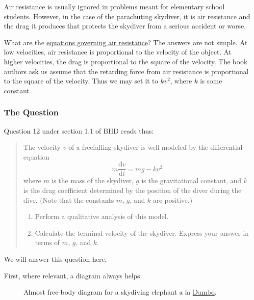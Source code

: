 \documentclass[
  a4paper,
]{article}
\begin{document}
Air resistance is usually ignored in problems meant for elementary
school students. However, in the case of the parachuting skydiver, it is
air resistance and the drag it produces that protects the skydiver from
a serious accident or worse.

What are the
\href{https://en.wikipedia.org/wiki/Drag_(physics)}{equations governing
air resistance}? The answers are not simple. At low velocities, air
resistance is proportional to the velocity of the object. At higher
velocities, the drag is proportional to the square of the velocity. The
book authors ask us assume that the retarding force from air resistance
is proportional to the square of the velocity. Thus we may set it to
\(kv^2\), where \(k\) is some constant.

\subsubsection{The Question}\label{the-question}

Question 12 under section 1.1 of BHD reads thus:

\begin{quote}
The velocity \(v\) of a freefalling skydiver is well modeled by the
differential equation \[
m\frac{\mathrm{d}v}{\mathrm{d}t} = mg - kv^2
\] where \(m\) is the mass of the skydiver, \(g\) is the gravitational
constant, and \(k\) is the drag coefficient determined by the position
of the diver during the dive. (Note that the constants \(m\), \(g\), and
\(k\) are positive.)

\begin{enumerate}
\def\labelenumi{(\alph{enumi})}
\item
  Perform a qualitative analysis of this model.
\item
  Calculate the terminal velocity of the skydiver. Express your answer
  in terms of \(m\), \(g\), and \(k\).
\end{enumerate}
\end{quote}

We will answer this question here.

First, where relevant, a diagram always helps.

\begin{figure}
\centering

\caption[Almost free-body diagram for a skydiving elephant a la
\href{https://en.wikipedia.org/wiki/Dumbo}{Dumbo}.]{Almost free-body
diagram\footnotemark{} for a skydiving elephant a la
\href{https://en.wikipedia.org/wiki/Dumbo}{Dumbo}.}\label{fig:skydiver}
\end{figure}
\end{document}
